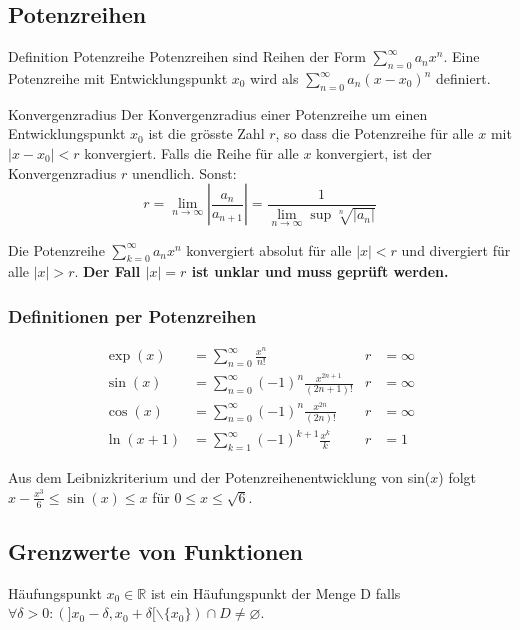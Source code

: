 \documentclass[a4paper,fontsize = 7pt]{scrartcl}
\def\limn{\lim_{n\to \infty}}
\def\sumk{\sum_{k=1}^\infty}
\def\sumn{\sum_{n=0}^\infty}
\def\R{\mathbb{R}}
\begin{document}
\subsection{Potenzreihen}
\begin{subbox}{Definition Potenzreihe}
\vspace{-4pt}
 Potenzreihen sind Reihen der Form $\sum_{n=0}^\infty a_n x^n$. Eine Potenzreihe mit Entwicklungspunkt $x_0$ wird als $\sum_{n=0}^\infty a_n(x-x_0)^n$ definiert.
 \vspace{-4pt}
\end{subbox}

\begin{mainbox}{Konvergenzradius}
  \vspace{-4pt}
 Der Konvergenzradius einer Potenzreihe um einen Entwicklungspunkt $x_0$ ist die grösste Zahl $r$, so dass die Potenzreihe für alle $x$ mit $|x - x_0| < r$ konvergiert. Falls die Reihe für alle $x$ konvergiert, ist der Konvergenzradius $r$ unendlich. Sonst:
 $$r = \limn \left| \frac{a_n}{a_{n+1}} \right| = \frac{1}{\limn\sup \sqrt[n]{|a_n|}} $$
 \vspace{-12pt}
\end{mainbox}
Die Potenzreihe $\sum_{k=0}^\infty a_n x^n$ konvergiert absolut für alle $|x| < r$ und divergiert für alle $|x| > r$. \textbf{Der Fall $|x| = r$ ist unklar und muss geprüft werden.}
\subsubsection{Definitionen per Potenzreihen}
\begin{align*}
\exp(x) &= \sumn \frac{x^n}{n!} & r &= \infty \\
\sin(x) &= \sumn (-1)^n \frac{x^{2n + 1}}{(2n + 1)!} & r &= \infty \\
\cos(x) &= \sumn (-1)^n \frac{x^{2n}}{(2n)!} & r &= \infty \\
\ln(x + 1) &= \sumk (-1)^{k+1} \frac{x^k}{k} & r &= 1
\end{align*}

Aus dem Leibnizkriterium und der Potenzreihenentwicklung von sin($x$) folgt $x - \frac{x^3}{6} \leq \sin (x) \leq x$ für $0 \leq x \leq \sqrt{6}$.

\subsection{Grenzwerte von Funktionen}
\begin{subbox}{Häufungspunkt}
  \vspace{-4pt}
 $x_0 \in \R$ ist ein Häufungspunkt der Menge D falls $\forall \delta > 0: (]x_0 - \delta, x_0 + \delta[ \backslash \{x_0\}) \cap D \ne \varnothing$.
 \vspace{-8pt}
\end{subbox}
\end{document}
